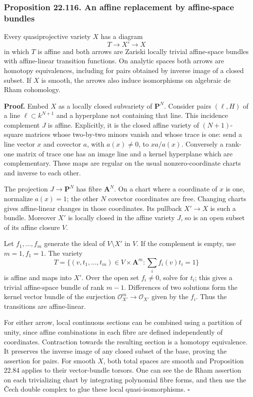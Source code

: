 \documentclass[
  11pt,
  a4paper,
]{article}
\begin{document}
\subsubsection{Proposition 22.116. An affine replacement by affine-space
bundles}\label{proposition-22.116.-an-affine-replacement-by-affine-space-bundles}

Every quasiprojective variety \(X\) has a diagram \[
 T\longrightarrow X'\longrightarrow X
 \tag{22.296}
\] in which \(T\) is affine and both arrows are Zariski locally trivial
affine-space bundles with affine-linear transition functions. On
analytic spaces both arrows are homotopy equivalences, including for
pairs obtained by inverse image of a closed subset. If \(X\) is smooth,
the arrows also induce isomorphisms on algebraic de Rham cohomology.

\textbf{Proof.} Embed \(X\) as a locally closed subvariety of
\(\mathbf P^N\). Consider pairs \((\ell,H)\) of a line
\(\ell\subset k^{N+1}\) and a hyperplane not containing that line. This
incidence complement \(J\) is affine. Explicitly, it is the closed
affine variety of \((N+1)\)-square matrices whose two-by-two minors
vanish and whose trace is one: send a line vector \(x\) and covector
\(a\), with \(a(x)\ne0\), to \(xa/a(x)\). Conversely a rank-one matrix
of trace one has an image line and a kernel hyperplane which are
complementary. These maps are regular on the usual nonzero-coordinate
charts and inverse to each other.

The projection \(J\to\mathbf P^N\) has fibre \(\mathbf A^N\). On a chart
where a coordinate of \(x\) is one, normalize \(a(x)=1\); the other
\(N\) covector coordinates are free. Changing charts gives affine-linear
changes in those coordinates. Its pullback \(X'\to X\) is such a bundle.
Moreover \(X'\) is locally closed in the affine variety \(J\), so is an
open subset of its affine closure \(V\).

Let \(f_1,\ldots,f_m\) generate the ideal of \(V\setminus X'\) in \(V\).
If the complement is empty, use \(m=1,f_1=1\). The variety \[
 T=\{(v,t_1,\ldots,t_m)\in V\times\mathbf A^m:
                     \textstyle\sum_i f_i(v)t_i=1\}
 \tag{22.297}
\] is affine and maps into \(X'\). Over the open set \(f_i\ne0\), solve
for \(t_i\); this gives a trivial affine-space bundle of rank \(m-1\).
Differences of two solutions form the kernel vector bundle of the
surjection \(\mathcal O_{X'}^m\to\mathcal O_{X'}\) given by the \(f_i\).
Thus the transitions are affine-linear.

For either arrow, local continuous sections can be combined using a
partition of unity, since affine combinations in each fibre are defined
independently of coordinates. Contraction towards the resulting section
is a homotopy equivalence. It preserves the inverse image of any closed
subset of the base, proving the assertion for pairs. For smooth \(X\),
both total spaces are smooth and Proposition 22.84 applies to their
vector-bundle torsors. One can see the de Rham assertion on each
trivializing chart by integrating polynomial fibre forms, and then use
the Čech double complex to glue these local quasi-isomorphisms.
\(\square\)
\end{document}
